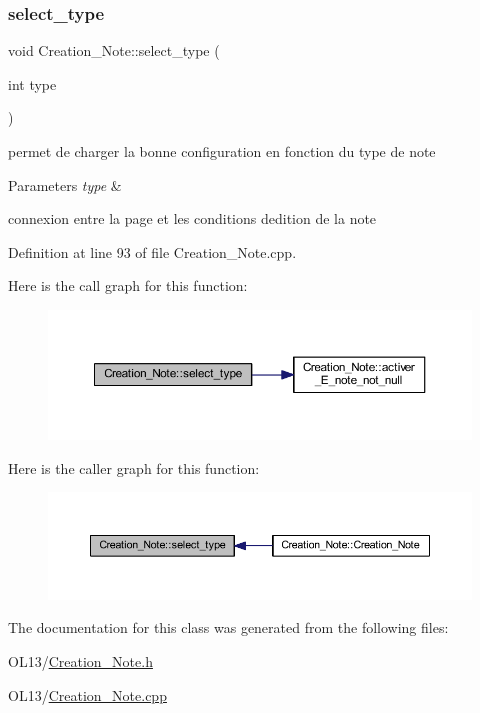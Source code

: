 \subsubsection{\texorpdfstring{select\+\_\+type}{select\_type}}
{\footnotesize\ttfamily void Creation\+\_\+\+Note\+::select\+\_\+type (\begin{DoxyParamCaption}\item[{int}]{type }\end{DoxyParamCaption})\hspace{0.3cm}{\ttfamily [slot]}}



permet de charger la bonne configuration en fonction du type de note 


\begin{DoxyParams}{Parameters}
{\em type} & \\
\hline
\end{DoxyParams}
connexion entre la page et les conditions d\textquotesingle{}edition de la note 

Definition at line 93 of file Creation\+\_\+\+Note.\+cpp.

Here is the call graph for this function\+:\nopagebreak
\begin{figure}[H]
\begin{center}
\leavevmode
\includegraphics[width=350pt]{class_creation___note_a4627e5957db87af2b7c43937857e9d6e_cgraph}
\end{center}
\end{figure}
Here is the caller graph for this function\+:\nopagebreak
\begin{figure}[H]
\begin{center}
\leavevmode
\includegraphics[width=350pt]{class_creation___note_a4627e5957db87af2b7c43937857e9d6e_icgraph}
\end{center}
\end{figure}


The documentation for this class was generated from the following files\+:\begin{DoxyCompactItemize}
\item 
O\+L13/\hyperlink{_creation___note_8h}{Creation\+\_\+\+Note.\+h}\item 
O\+L13/\hyperlink{_creation___note_8cpp}{Creation\+\_\+\+Note.\+cpp}\end{DoxyCompactItemize}
